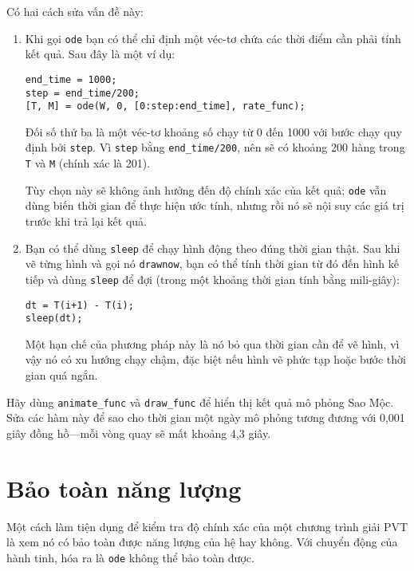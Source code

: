 \documentclass[12pt]{book}
\begin{document}
Có hai cách sửa vấn đề này:

\begin{enumerate}

\item Khi gọi {\tt ode} bạn có thể chỉ định một véc-tơ chứa các thời điểm
cần phải tính kết quả. Sau đây là một ví dụ:

\begin{verbatim}
end_time = 1000;
step = end_time/200;
[T, M] = ode(W, 0, [0:step:end_time], rate_func);
\end{verbatim}
%
Đối số thứ ba là một véc-tơ khoảng số chạy từ 0 đến 1000 với bước chạy
quy định bởi {\tt step}.  Vì {\tt step} bằng \verb#end_time/200#, nên
sẽ có khoảng 200 hàng trong {\tt T} và {\tt M} (chính xác là 201).

Tùy chọn này sẽ không ảnh hưởng đến độ chính xác của kết quả; 
{\tt ode} vẫn dùng biến thời gian để thực hiện ước tính, nhưng rồi
nó sẽ nội suy các giá trị trước khi trả lại kết quả.

\item Bạn có thể dùng {\tt sleep} để chạy hình động theo đúng thời
gian thật. Sau khi vẽ từng hình và gọi nó {\tt drawnow}, bạn có thể
tính thời gian từ đó đến hình kế tiếp và dùng {\tt sleep} để đợi 
(trong một khoảng thời gian tính bằng mili-giây):

\begin{verbatim}
dt = T(i+1) - T(i);
sleep(dt);
\end{verbatim}
%
Một hạn chế của phương pháp này là nó bỏ qua thời gian cần để
vẽ hình, vì vậy nó có xu hướng chạy chậm, đặc biệt nếu hình vẽ 
phức tạp hoặc bước thời gian quá ngắn.

\end{enumerate}

\begin{ex}
Hãy dùng \verb#animate_func# và \verb#draw_func# để hiển thị
kết quả mô phỏng Sao Mộc. Sửa các hàm này để sao cho thời gian
một ngày mô phỏng tương đương với 0,001 giây đồng hồ---mỗi
vòng quay sẽ mất khoảng 4,3 giây.
\end{ex}


\section{Bảo toàn năng lượng}

Một cách làm tiện dụng để kiểm tra độ chính xác của một chương trình
giải PVT là xem nó có bảo toàn được năng lượng của hệ hay không.
Với chuyển động của hành tinh, hóa ra là {\tt ode} không thể
bảo toàn được.
\end{document}

